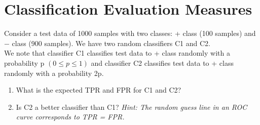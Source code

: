 \documentclass{article}
\begin{document}
\begin{enumerate} [label= (\alph*)]
\end{enumerate}

\section{Classification Evaluation Measures}

Consider a test data of 1000 samples with two classes: + class (100 samples) and $-$ class (900 samples). We have two random classifiers C1 and C2.
\\
We note that classifier C1 classifies test data to + class randomly with a probability p $(0 \le p \le 1)$ and classifier C2 classifies test data to + class randomly with a probability 2p.

\begin{enumerate}[label= (\alph*)]
    \item What is the expected TPR and FPR for C1 and C2\@?
    \item Is C2 a better classifier than C1? \emph{Hint: The random guess line in an ROC curve corresponds to TPR = FPR.}
\end{enumerate}
\end{document}
